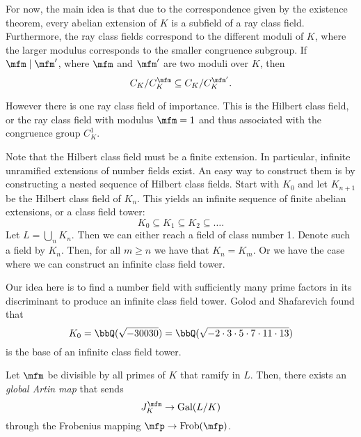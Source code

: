 \documentclass[a4paper, 12pt,oneside,openany]{book}
\begin{document}

For now, the main idea is that due to the correspondence given by the existence theorem, every abelian extension of $K$ is a subfield of a ray class field. Furthermore, the ray class fields correspond to the different moduli of $K$, where the larger modulus corresponds to the smaller congruence subgroup. If $\mfm \mid \mfm'$, where $\mfm$ and $\mfm'$ are two moduli over $K$, then $$C_K/C_K^\mfm \subseteq C_K/C_K^{\mfm'}.$$

However there is one ray class field of importance. This is the Hilbert class field, or the ray class field with modulus $\mfm=1$ and thus associated with the congruence group $C_K^1$. 


Note that the Hilbert class field must be a finite extension. In particular, infinite unramified extensions of number fields exist. An easy way to construct them is by constructing a nested sequence of Hilbert class fields. Start with $K_0$ and let $K_{n+1}$ be the Hilbert class field of $K_n$. This yields an infinite sequence of finite abelian extensions, or a class field tower: $$K_0 \subseteq K_1 \subseteq K_2 \subseteq \dots.$$ Let $L = \bigcup\limits_n K_n$. Then we can either reach a field of class number 1. Denote such a field by $K_n$. Then, for all $m\geq n$ we have that $K_n = K_m$. Or we have the case where we can construct an infinite class field tower.

Our idea here is to find a number field with sufficiently many prime factors in its discriminant to produce an infinite class field tower. Golod and Shafarevich found that $$K_0 = \bbQ(\sqrt{-30030}) = \bbQ(\sqrt{-2\cdot3\cdot5\cdot7\cdot11\cdot13})$$ is the base of an infinite class field tower.

Let $\mfm$ be divisible by all primes of $K$ that ramify in $L$. Then, there exists an \emph{global Artin map} that sends $$J_K^\mfm \to \text{Gal}(L/K)$$ through the Frobenius mapping $\mfp \to \text{Frob}(\mfp)$. 

\end{document}
